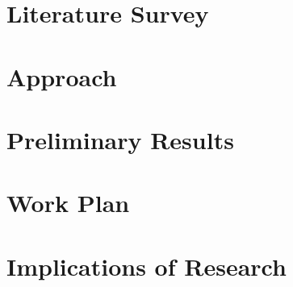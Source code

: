 \documentclass[12pt,a4paper,oneside]{article}
\begin{document}
\section{ Literature Survey }


\section{ Approach }

\section{ Preliminary Results }

\section{ Work Plan }

\section{ Implications of Research }


\newpage
{}

\end{document}
